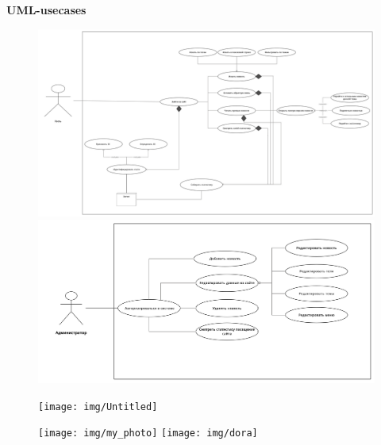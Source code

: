 \begin{center}
    \LARGE
    \textbf{UML-usecases}
    \normalsize
        \begin{figure}[H]
        \centering
        \includegraphics[scale=0.05]{img/Untitled Workspace-9}\\
        \includegraphics[scale=0.1]{img/Untitled Workspace-11}\\
    \end{figure}
\end{center}
\newpage
\BgThispage

\newpage
\BgThispage
\begin{center}
    \begin{figure}[H]
        \centering
        \texttt{[image: img/Untitled]}
    \end{figure}
    \begin{figure}[H]
        \centering
        \texttt{[image: img/my\_photo]}
        \texttt{[image: img/dora]}
    \end{figure}
\end{center}